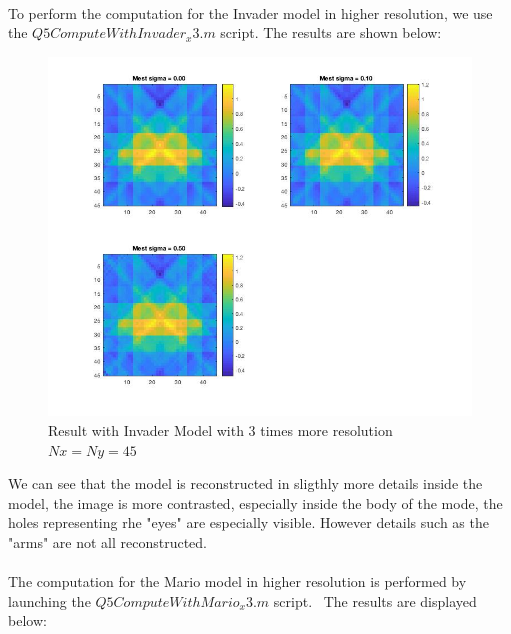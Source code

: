 \documentclass[12pt,a4paper]{extreport}
\begin{document}
\paragraph*{}
To perform the computation for the Invader model in higher resolution, we use the $Q5ComputeWithInvader_x3.m$ script.
The results are shown below:

\begin{figure}[h]
\includegraphics[width=15cm]{InvaderResults3x.jpg} 
\caption{Result with Invader Model with 3 times more resolution$Nx=Ny=45$}
\end{figure}

We can see that the model is reconstructed in sligthly more details inside the model, the image is more contrasted, especially inside the body of the mode, the holes representing rhe "eyes" are especially visible. However details such as the "arms" are not all reconstructed.

\paragraph*{}
The computation for the Mario model in higher resolution is performed by launching the $Q5ComputeWithMario_x3.m$ script.
\
The results are displayed below:
\end{document}
